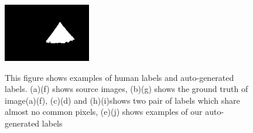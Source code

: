 \documentclass[runningheads,a4paper]{llncs}
\begin{document}
\begin{figure}[!tb]
{\includegraphics[width=0.15\columnwidth,height=1in]{images/188063-gt.png}
}

\caption{ This figure shows examples of human labels and auto-generated labels. (a)(f) shows source images, (b)(g) shows the ground truth of image(a)(f), (c)(d) and (h)(i)shows two pair of labels which share almost no common pixels, (e)(j) shows examples of our auto-generated labels }
\label{fig:example}
\end{figure}
\end{document}
